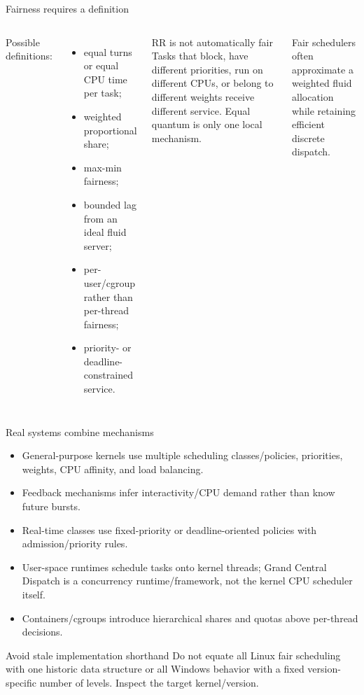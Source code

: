 \documentclass[aspectratio=169,11pt]{beamer}
\begin{document}
\begin{frame}{Fairness requires a definition}
  \begin{columns}[T,onlytextwidth]
      Possible definitions:
      \begin{itemize}
        \item equal turns or equal CPU time per task;
        \item weighted proportional share;
        \item max-min fairness;
        \item bounded lag from an ideal fluid server;
        \item per-user/cgroup rather than per-thread fairness;
        \item priority- or deadline-constrained service.
      \end{itemize}
      \begin{alertblock}{RR is not automatically fair}
        Tasks that block, have different priorities, run on different CPUs, or belong to different weights receive different service. Equal quantum is only one local mechanism.
      \end{alertblock}
      \begin{tcolorbox}[title=Production view]
        Fair schedulers often approximate a weighted fluid allocation while retaining efficient discrete dispatch.
      \end{tcolorbox}
  \end{columns}
\end{frame}

\begin{frame}{Real systems combine mechanisms}
  \begin{itemize}
    \item General-purpose kernels use multiple scheduling classes/policies, priorities, weights, CPU affinity, and load balancing.
    \item Feedback mechanisms infer interactivity/CPU demand rather than know future bursts.
    \item Real-time classes use fixed-priority or deadline-oriented policies with admission/priority rules.
    \item User-space runtimes schedule tasks onto kernel threads; Grand Central Dispatch is a concurrency runtime/framework, not the kernel CPU scheduler itself.
    \item Containers/cgroups introduce hierarchical shares and quotas above per-thread decisions.
  \end{itemize}
  \begin{alertblock}{Avoid stale implementation shorthand}
    Do not equate all Linux fair scheduling with one historic data structure or all Windows behavior with a fixed version-specific number of levels. Inspect the target kernel/version.
  \end{alertblock}
\end{frame}
\end{document}
